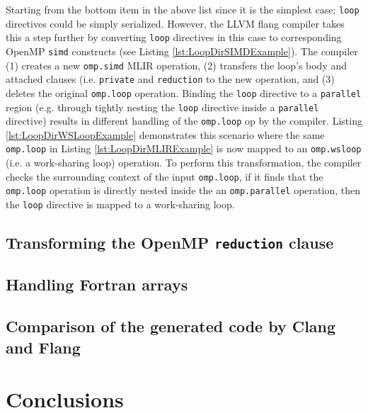 \documentclass[acmtog,natbib=false]{acmart}
\newcommand{\code}[1]{\texttt{#1}\xspace}
\begin{document}
Starting from the bottom item in the above list since it is the simplest case; \code{loop} directives could be simply serialized.
However, the LLVM flang compiler takes this a step further by converting \code{loop} directives in this case to corresponding OpenMP \code{simd} constructs (see Listing \ref{lst:LoopDirSIMDExample}).
The compiler (1) creates a new \code{omp.simd} MLIR operation, (2) transfers the loop's body and attached clauses (i.e. \code{private} and \code{reduction} to the new operation, and (3) deletes the original \code{omp.loop} operation. Binding the \code{loop} directive to a \code{parallel} region (e.g. through tightly nesting the \code{loop} directive inside a \code{parallel} directive) results in different handling of the \code{omp.loop} op by the compiler.
Listing \ref{lst:LoopDirWSLoopExample} demonstrates this scenario where the same \code{omp.loop} in Listing \ref{lst:LoopDirMLIRExample} is now mapped to an \code{omp.wsloop} (i.e. a work-sharing loop) operation.
To perform this transformation, the compiler checks the surrounding context of the input \code{omp.loop}, if it finds that the \code{omp.loop} operation is directly nested inside the an \code{omp.parallel} operation, then the \code{loop} directive is mapped to a work-sharing loop.

\subsection{Transforming the OpenMP \code{reduction} clause}
\label{sec:OpenMPReduction}

\subsection{Handling Fortran arrays}
\subsection{Comparison of the generated code by Clang and Flang}



\section{Conclusions}
\label{sec:Conclusions}


\end{document}
